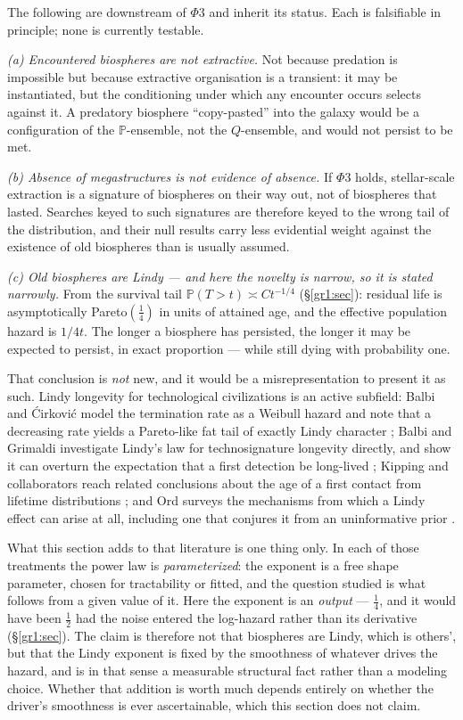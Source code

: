 \documentclass[11pt]{article}
\numberwithin{equation}{section}
\theoremstyle{plain}
\theoremstyle{definition}
\theoremstyle{remark}
\newcommand{\PP}{\mathbb{P}}
\begin{document}
The following are downstream of $\Phi3$ and inherit its status. Each is
falsifiable in principle; none is currently testable.

\emph{(a) Encountered biospheres are not extractive.} Not because
predation is impossible but because extractive organisation is a
transient: it may be instantiated, but the conditioning under which any
encounter occurs selects against it. A predatory biosphere
``copy-pasted'' into the galaxy would be a configuration of the
$\PP$-ensemble, not the $Q$-ensemble, and would not persist to be met.

\emph{(b) Absence of megastructures is not evidence of absence.} If
$\Phi3$ holds, stellar-scale extraction is a signature of biospheres on
their way out, not of biospheres that lasted. Searches keyed to such
signatures \cite{Dys60} are therefore keyed to the wrong tail of the
distribution, and their null results carry less evidential weight
against the existence of old biospheres than is usually assumed.

\emph{(c) Old biospheres are Lindy --- and here the novelty is narrow,
so it is stated narrowly.} From the survival tail
$\PP(T>t)\asymp Ct^{-1/4}$ (\S\ref{gr1:sec}): residual life is
asymptotically Pareto$(\tfrac14)$ in units of attained age, and the
effective population hazard is $1/4t$. The longer a biosphere has
persisted, the longer it may be expected to persist, in exact
proportion --- while still dying with probability one.

That conclusion is \emph{not} new, and it would be a misrepresentation
to present it as such. Lindy longevity for technological civilizations
is an active subfield: Balbi and \'Cirkovi\'c model the termination rate
as a Weibull hazard and note that a decreasing rate yields a
Pareto-like fat tail of exactly Lindy character \cite{BC21}; Balbi and
Grimaldi investigate Lindy's law for technosignature longevity directly,
and show it can overturn the expectation that a first detection be
long-lived \cite{BG24}; Kipping and collaborators reach related
conclusions about the age of a first contact from lifetime distributions
\cite{Kip20}; and Ord surveys the mechanisms from which a Lindy effect
can arise at all, including one that conjures it from an uninformative
prior \cite{Ord23,Tal12}.

What this section adds to that literature is one thing only. In each of
those treatments the power law is \emph{parameterized}: the exponent is
a free shape parameter, chosen for tractability or fitted, and the
question studied is what follows from a given value of it. Here the
exponent is an \emph{output} --- $\tfrac14$, and it would have been
$\tfrac12$ had the noise entered the log-hazard rather than its
derivative (\S\ref{gr1:sec}). The claim is therefore not that biospheres are
Lindy, which is others', but that the Lindy exponent is fixed by the
smoothness of whatever drives the hazard, and is in that sense a
measurable structural fact rather than a modeling choice. Whether that
addition is worth much depends entirely on whether the driver's
smoothness is ever ascertainable, which this section does not claim.
\end{document}
